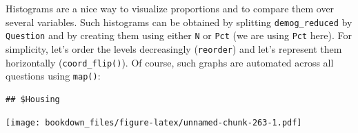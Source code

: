 \documentclass[
]{krantz}
\makeatletter
\newenvironment{Shaded}{\begin{snugshade}}{\end{snugshade}}
\newcommand{\AttributeTok}[1]{\textcolor[rgb]{0.61,0.61,0.61}{#1}}
\newcommand{\ControlFlowTok}[1]{\textcolor[rgb]{0.27,0.27,0.27}{\textbf{#1}}}
\newcommand{\DecValTok}[1]{\textcolor[rgb]{0.06,0.06,0.06}{#1}}
\newcommand{\FunctionTok}[1]{\textcolor[rgb]{0,0,0}{#1}}
\newcommand{\NormalTok}[1]{#1}
\newcommand{\OtherTok}[1]{\textcolor[rgb]{0.37,0.37,0.37}{#1}}
\newcommand{\SpecialCharTok}[1]{\textcolor[rgb]{0,0,0}{#1}}
\newcommand{\StringTok}[1]{\textcolor[rgb]{0.5,0.5,0.5}{#1}}
\newenvironment{kframe}{%
\medskip{}
\setlength{\fboxsep}{.8em}
 \def\at@end@of@kframe{}%
 \ifinner\ifhmode%
  \def\at@end@of@kframe{\end{minipage}}%
  \begin{minipage}{\columnwidth}%
 \fi\fi%
 \def\FrameCommand##1{\hskip\@totalleftmargin \hskip-\fboxsep
 \colorbox{shadecolor}{##1}\hskip-\fboxsep
     \hskip-\linewidth \hskip-\@totalleftmargin \hskip\columnwidth}%
 \MakeFramed {\advance\hsize-\width
   \@totalleftmargin\z@ \linewidth\hsize
   \@setminipage}}%
 {\par\unskip\endMakeFramed%
 \at@end@of@kframe}
\renewenvironment{Shaded}{\begin{kframe}}{\end{kframe}}
\makeatother
\begin{document}
Histograms are a nice way to visualize proportions and to compare them over several variables. Such histograms can be obtained by splitting \texttt{demog\_reduced} by \texttt{Question} and by creating them using either \texttt{N} or \texttt{Pct} (we are using \texttt{Pct} here). For simplicity, let's order the levels decreasingly (\texttt{reorder}) and let's represent them horizontally (\texttt{coord\_flip()}). Of course, such graphs are automated across all questions using \texttt{map()}:

\begin{Shaded}
\end{Shaded}

\begin{verbatim}
## $Housing
\end{verbatim}

\texttt{[image: bookdown\_files/figure-latex/unnamed-chunk-263-1.pdf]}
\end{document}
